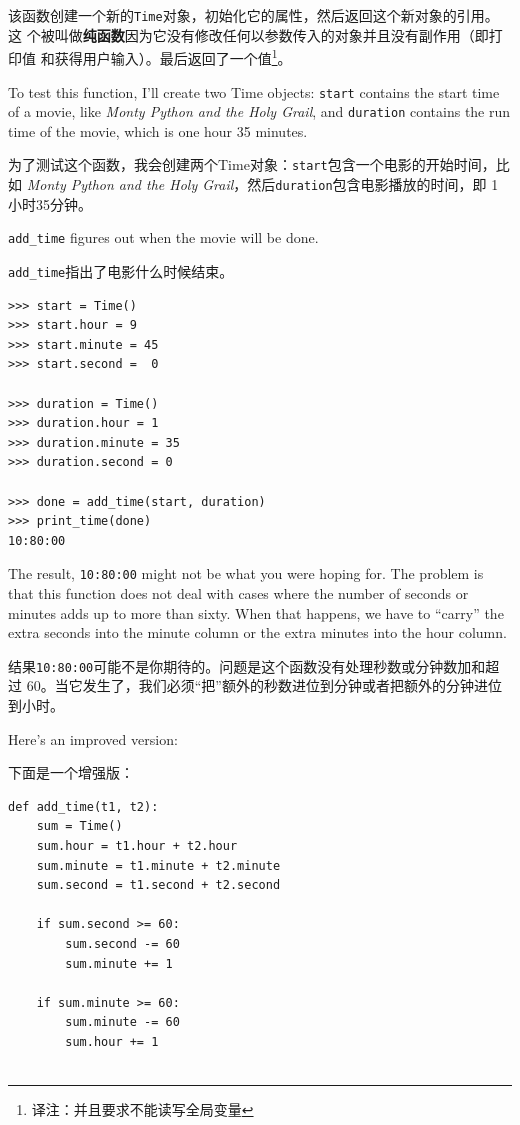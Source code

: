 \documentclass[10pt]{book}
\begin{document}
\begin{CJK}{UTF8}{gbsn}
该函数创建一个新的{\tt Time}对象，初始化它的属性，然后返回这个新对象的引用。这
个被叫做{\bf 纯函数}因为它没有修改任何以参数传入的对象并且没有副作用（即打印值
和获得用户输入）。最后返回了一个值\footnote{译注：并且要求不能读写全局变量}。

To test this function, I'll create two Time objects: {\tt start}
contains the start time of a movie, like {\em Monty Python and the
Holy Grail}, and {\tt duration} contains the run time of the movie,
which is one hour 35 minutes.

为了测试这个函数，我会创建两个Time对象：{\tt start}包含一个电影的开始时间，比如
{\em Monty Python and the Holy Grail}，然后{\tt duration}包含电影播放的时间，即
1小时35分钟。

\verb"add_time" figures out when the movie will be done.

\verb"add_time"指出了电影什么时候结束。

\begin{verbatim}
>>> start = Time()
>>> start.hour = 9
>>> start.minute = 45
>>> start.second =  0

>>> duration = Time()
>>> duration.hour = 1
>>> duration.minute = 35
>>> duration.second = 0

>>> done = add_time(start, duration)
>>> print_time(done)
10:80:00
\end{verbatim}
%
The result, {\tt 10:80:00} might not be what you were hoping
for.  The problem is that this function does not deal with cases where the
number of seconds or minutes adds up to more than sixty.  When that
happens, we have to ``carry'' the extra seconds into the minute column
or the extra minutes into the hour column.

结果{\tt 10:80:00}可能不是你期待的。问题是这个函数没有处理秒数或分钟数加和超过
60。当它发生了，我们必须``把''额外的秒数进位到分钟或者把额外的分钟进位到小时。

Here's an improved version:

下面是一个增强版：

\begin{verbatim}
def add_time(t1, t2):
    sum = Time()
    sum.hour = t1.hour + t2.hour
    sum.minute = t1.minute + t2.minute
    sum.second = t1.second + t2.second

    if sum.second >= 60:
        sum.second -= 60
        sum.minute += 1

    if sum.minute >= 60:
        sum.minute -= 60
        sum.hour += 1


\end{verbatim}
\end{CJK}
\end{document}

